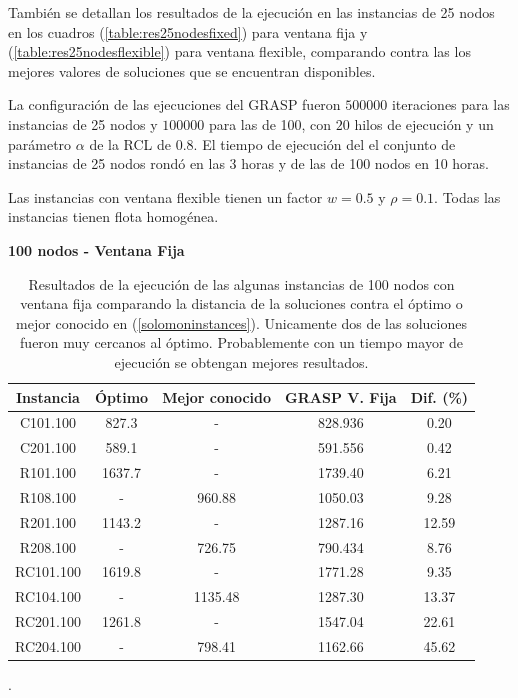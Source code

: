 \documentclass{article}
\begin{document}
  También se detallan los resultados de la ejecución en las instancias de 25 nodos en los cuadros (\ref{table:res25nodesfixed}) para ventana fija y (\ref{table:res25nodesflexible}) para ventana flexible, comparando contra las los mejores valores de soluciones que se encuentran disponibles.

  La configuración de las ejecuciones del GRASP fueron $500000$ iteraciones para las instancias de 25 nodos y $100000$ para las de 100, con $20$ hilos de ejecución y un parámetro $\alpha$ de la RCL de $0.8$. El tiempo de ejecución del el conjunto de instancias de 25 nodos rondó en las 3 horas y de las de 100 nodos en 10 horas.

  Las instancias con ventana flexible tienen un factor $w = 0.5$ y $\rho = 0.1$. Todas las instancias tienen flota homogénea.

  \begin{table}[h!]
    \centering
    \caption*{{\bf 100 nodos - Ventana Fija}}
    \begin{tabular}{ccccc}
      \toprule
      Instancia & Óptimo & Mejor conocido & GRASP V. Fija & Dif. (\%) \\
      \midrule
      C101.100  & 827.3  &       - & 828.936 &  0.20 \\
      C201.100  & 589.1  &       - & 591.556 &  0.42 \\
      R101.100  & 1637.7 &       - & 1739.40 &  6.21 \\
      R108.100  &      - &  960.88 & 1050.03 &  9.28 \\
      R201.100  & 1143.2 &       - & 1287.16 & 12.59 \\
      R208.100  &      - &  726.75 & 790.434 &  8.76 \\ 
      RC101.100 & 1619.8 &       - & 1771.28 &  9.35 \\
      RC104.100 &      - & 1135.48 & 1287.30 & 13.37 \\
      RC201.100 & 1261.8 &       - & 1547.04 & 22.61 \\
      RC204.100 &      - &  798.41 & 1162.66 & 45.62 \\
      \bottomrule
    \end{tabular}
    \caption{Resultados de la ejecución de las algunas instancias de 100 nodos con ventana fija comparando la distancia de la soluciones contra el óptimo o mejor conocido en (\ref{solomoninstances}). Unicamente dos de las soluciones fueron muy cercanos al óptimo. Probablemente con un tiempo mayor de ejecución se obtengan mejores resultados.}\label{table:res100nodesfixed}.
  \end{table}
\end{document}
